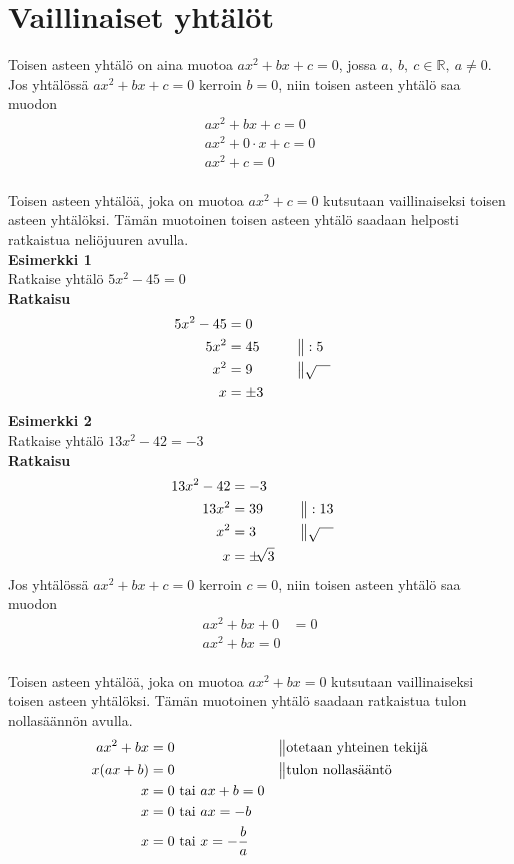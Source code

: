 \section{Vaillinaiset yhtälöt}
Toisen asteen yhtälö on aina muotoa $ax^2+bx+c=0$, jossa $a, \ b, \ c \in \mathbb{R}, \ a \neq 0$. \\
Jos yhtälössä $ax^2+bx+c=0$ kerroin $b=0$, niin toisen asteen yhtälö saa muodon
\begin{align*}
ax^2+bx+c=0 \\
ax^2+0 \cdot x+c=0 \\
ax^2+c=0
\end{align*}
 \\
Toisen asteen yhtälöä, joka on muotoa $ax^2+c=0$ kutsutaan vaillinaiseksi toisen asteen yhtälöksi. Tämän muotoinen toisen asteen yhtälö saadaan helposti ratkaistua neliöjuuren avulla.\\
\textbf{Esimerkki 1} \\
Ratkaise yhtälö $5x^2-45=0$ \\
\textbf{Ratkaisu}
\begin{align*}
5x^2-45&=0 \\
5x^2&=45  \ \ \ \ \ &&\big\|:5 \\
x^2&=9 &&\big\| \sqrt{\quad} \\
x&= \pm 3
\end{align*}
\textbf{Esimerkki 2} \\
Ratkaise yhtälö $13x^2-42=-3$ \\
\textbf{Ratkaisu} \\
\begin{align*}
13x^2-42&=-3 \\
13x^2&=39 \ \ \ \ \ &&\big\|:13 \\
x^2&=3 \ \ \ \ \ &&\big\| \sqrt{\quad} \\
x&=\pm \sqrt[]{3}
\end{align*}
Jos yhtälössä $ax^2+bx+c=0$ kerroin $c=0$, niin toisen asteen yhtälö saa muodon
\begin{align*}
ax^2+bx+0&=0 \\
ax^2+bx=0
\end{align*}
 \\
Toisen asteen yhtälöä, joka on muotoa $ax^2+bx=0$ kutsutaan vaillinaiseksi toisen asteen yhtälöksi. Tämän muotoinen yhtälö saadaan ratkaistua tulon nollasäännön avulla. \\
\begin{align*}
ax^2+bx&=0 \ \ \ \ \ &&\big\|\text{otetaan yhteinen tekijä} \\
x(ax+b)&=0 \ \ \ \ \ &&\big\|\text{tulon nollasääntö} \\
x&=0 \text{ tai } ax+b=0 \\
x&=0 \text{ tai } ax=-b \\
x&=0 \text{ tai } x=-\frac{b}{a}
\end{align*}
